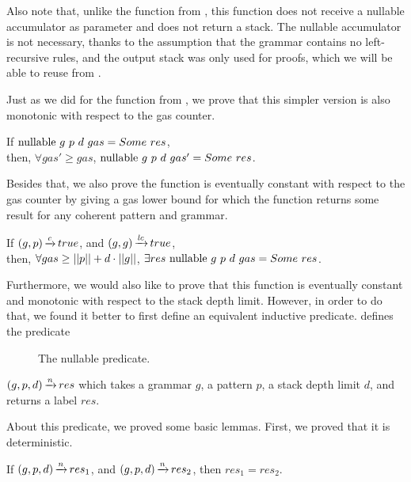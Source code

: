 Also note that, unlike the function from ,
this function does not receive a nullable accumulator as parameter
and does not return a stack.
The nullable accumulator is not necessary,
thanks to the assumption that
the grammar contains no left-recursive rules,
and the output stack was only used for proofs,
which we will be able to reuse from .

Just as we did for the function from ,
we prove that this simpler version is also
monotonic
with respect to the gas counter.

\begin{lemma}%
    If $\text{nullable}\ g\ p\ d\ gas = Some\ res$, \\
    then, $\forall gas' \ge gas$,
    $\text{nullable}\ g\ p\ d\ gas' = Some\ res$.
    \label{lemma:nullable-gas-monotonicity}
\end{lemma}

Besides that, we also prove the function
is eventually constant with respect to the gas counter
by giving a gas lower bound for which the function
returns some result for any coherent pattern and grammar.

\begin{lemma}%
    If $(g,p) \operatorname{\xrightarrow{\mathit{c}}} true$,
    and $(g,g) \operatorname{\xrightarrow{\mathit{lc}}} true$, \\
    then, $\forall gas \ge ||p|| + d \cdot ||g||$,
    $\exists res\ \nullablecomp{g}{p}{d}{gas} = \Some res$.
    \label{lemma:nullable-termination}
\end{lemma}

Furthermore, we would also like to prove that
this function is eventually constant and monotonic
with respect to the stack depth limit.
However, in order to do that,
we found it better to first define an equivalent inductive predicate.
 defines the predicate
\begin{figure}
    \centering
    
    \caption{The nullable predicate.}
    \label{fig:nullable-predicate}
\end{figure}
$(g,p,d) \operatorname{\xrightarrow{\mathit{n}}} res$ which takes a grammar $g$,
a pattern $p$, a stack depth limit $d$, and returns a label $res$.

About this predicate, we proved some basic lemmas.
First, we proved that it is deterministic.

\begin{lemma}
    If $(g,p,d) \operatorname{\xrightarrow{\mathit{n}}} res_1$,
    and $(g,p,d) \operatorname{\xrightarrow{\mathit{n}}} res_2$,
    then $res_1 = res_2$.
\end{lemma}

